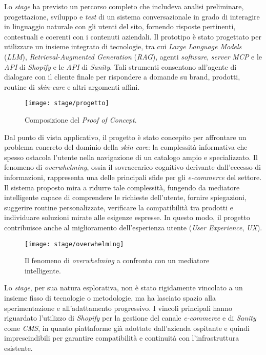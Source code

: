 Lo \emph{stage} ha previsto un percorso completo che includeva analisi preliminare, progettazione, sviluppo e \emph{test} di un sistema conversazionale in grado di 
interagire in linguaggio naturale con gli utenti del sito, fornendo risposte pertinenti, contestuali e coerenti con i contenuti aziendali. 
Il prototipo è stato progettato per utilizzare un insieme integrato di tecnologie, tra cui \emph{Large Language Models} (\emph{LLM}), \emph{Retrieval-Augmented Generation} (\emph{RAG}), 
agenti \emph{software}, \emph{server} \emph{MCP} e le \emph{API} di \emph{Shopify} e le \emph{API} di \emph{Sanity}. 
Tali strumenti consentono all’agente di dialogare con il cliente finale per rispondere a domande su brand, prodotti, routine di \emph{skin-care} e altri argomenti affini.
\begin{figure}[H]
    \centering
    \texttt{[image: stage/progetto]}
    \caption{Composizione del \emph{Proof of Concept}.}
    \label{fig:progetto}
  \end{figure}
Dal punto di vista applicativo, il progetto è stato concepito per affrontare un problema concreto del dominio della \emph{skin-care}: la complessità informativa 
che spesso ostacola l’utente nella navigazione di un catalogo ampio e specializzato. 
Il fenomeno di \emph{overwhelming}, ossia il sovraccarico cognitivo derivante dall’eccesso di informazioni, rappresenta una delle principali sfide per gli \emph{e-commerce} del settore. 
Il sistema proposto mira a ridurre tale complessità, fungendo da mediatore intelligente capace di comprendere le richieste dell’utente, fornire spiegazioni, suggerire routine personalizzate, 
verificare la compatibilità tra prodotti e individuare soluzioni mirate alle esigenze espresse. 
In questo modo, il progetto contribuisce anche al miglioramento dell’esperienza utente (\emph{User Experience}, \emph{UX}).
\begin{figure}[H]
    \centering
    \texttt{[image: stage/overwhelming]}
    \caption{Il fenomeno di \emph{overwhelming} a confronto con un mediatore intelligente.}
    \label{fig:overwhelming}
  \end{figure}
Lo \emph{stage}, per sua natura esplorativa, non è stato rigidamente vincolato a un insieme fisso di tecnologie o metodologie, ma ha lasciato spazio alla 
sperimentazione e all’adattamento progressivo. 
I vincoli principali hanno riguardato l’utilizzo di \emph{Shopify} per la gestione del canale \emph{e-commerce} e di \emph{Sanity} 
come \emph{CMS}, in quanto piattaforme già adottate dall’azienda ospitante e quindi imprescindibili per garantire compatibilità e continuità con l’infrastruttura esistente.

